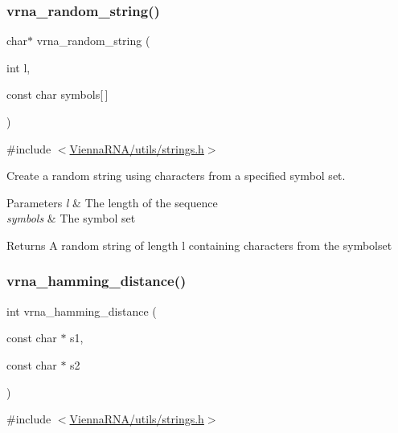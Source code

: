 \subsubsection{\texorpdfstring{vrna\_random\_string()}{vrna\_random\_string()}}
{\footnotesize\ttfamily char$\ast$ vrna\+\_\+random\+\_\+string (\begin{DoxyParamCaption}\item[{int}]{l,  }\item[{const char}]{symbols\mbox{[}$\,$\mbox{]} }\end{DoxyParamCaption})}



{\ttfamily \#include $<$\mbox{\hyperlink{strings_8h}{Vienna\+R\+N\+A/utils/strings.\+h}}$>$}



Create a random string using characters from a specified symbol set. 


\begin{DoxyParams}{Parameters}
{\em l} & The length of the sequence \\
\hline
{\em symbols} & The symbol set \\
\hline
\end{DoxyParams}
\begin{DoxyReturn}{Returns}
A random string of length \textquotesingle{}l\textquotesingle{} containing characters from the symbolset 
\end{DoxyReturn}
\mbox{\label{group__string__utils_ga301798b43b6f66687985c725efd14f32}} 
\subsubsection{\texorpdfstring{vrna\_hamming\_distance()}{vrna\_hamming\_distance()}}
{\footnotesize\ttfamily int vrna\+\_\+hamming\+\_\+distance (\begin{DoxyParamCaption}\item[{const char $\ast$}]{s1,  }\item[{const char $\ast$}]{s2 }\end{DoxyParamCaption})}



{\ttfamily \#include $<$\mbox{\hyperlink{strings_8h}{Vienna\+R\+N\+A/utils/strings.\+h}}$>$}



